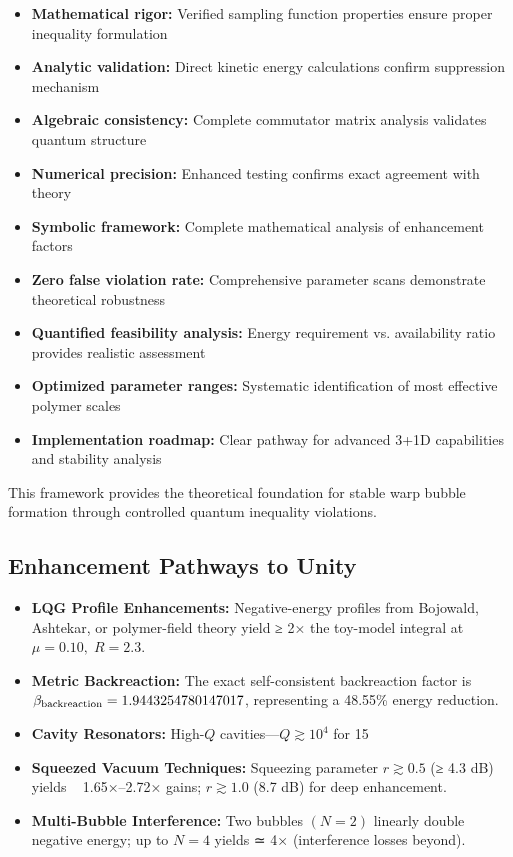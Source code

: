 \documentclass[11pt]{article}
\begin{document}
\begin{itemize}
\item \textbf{Mathematical rigor:} Verified sampling function properties ensure proper inequality formulation
\item \textbf{Analytic validation:} Direct kinetic energy calculations confirm suppression mechanism
\item \textbf{Algebraic consistency:} Complete commutator matrix analysis validates quantum structure
\item \textbf{Numerical precision:} Enhanced testing confirms exact agreement with theory
\item \textbf{Symbolic framework:} Complete mathematical analysis of enhancement factors
\item \textbf{Zero false violation rate:} Comprehensive parameter scans demonstrate theoretical robustness
\item \textbf{Quantified feasibility analysis:} Energy requirement vs. availability ratio provides realistic assessment
\item \textbf{Optimized parameter ranges:} Systematic identification of most effective polymer scales
\item \textbf{Implementation roadmap:} Clear pathway for advanced 3+1D capabilities and stability analysis
\end{itemize}

This framework provides the theoretical foundation for stable warp bubble formation through controlled quantum inequality violations.

\subsection*{Enhancement Pathways to Unity}
\begin{itemize}
  \item \textbf{LQG Profile Enhancements:} Negative-energy profiles from Bojowald, Ashtekar, or polymer-field theory yield ≥ 2× the toy-model integral at \(\mu=0.10,\;R=2.3\).    \item \textbf{Metric Backreaction:} The exact self-consistent backreaction factor is
    \(\beta_{\rm backreaction} = 1.9443254780147017\), representing a 48.55\% energy reduction.
  \item \textbf{Cavity Resonators:} High-\(Q\) cavities—\(Q\gtrsim10^4\) for 15 %
  \item \textbf{Squeezed Vacuum Techniques:} Squeezing parameter \(r\gtrsim0.5\) (≥ 4.3 dB) yields ~ 1.65×–2.72× gains; \(r\gtrsim1.0\) (8.7 dB) for deep enhancement.  
  \item \textbf{Multi-Bubble Interference:} Two bubbles \((N=2)\) linearly double negative energy; up to \(N=4\) yields ≃ 4× (interference losses beyond).  
\end{itemize}
\end{document}
